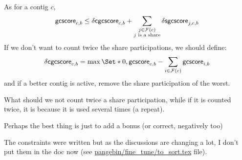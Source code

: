 \begin{ideabox}
    As for a contig \(c\), 
    \[
    \mathsf{gcscore}_{c, b} \leq \mathsf{\delta cgcscore}_{c, b} + \sum_{\substack{
        j \in \mathcal{F}{}(c) \\
        j \text{ is a share}
    }}\mathsf{\delta sgcscore}_{j, c, b}
    \]
    If we don't want to count twice the share participations, we should define:
    \[
    \dcgcscore{c}{b} = \max \Set*{
            0, 
            \gcscore{c}{b} - \sum_{i \in \Fragments{}(c)} \gcscore{i}{b}
        } 
    \]
    and if a better contig is active, remove the share participation of the worst.

    \begin{questionbox}
        What should we not count twice a share participation, while if it is counted twice, it is because it is used several times (a repeat).

        Perhaps the best thing is just to add a bonus (or correct, negatively too)
    \end{questionbox}
\end{ideabox}

\begin{notebox}
    The constraints were written but as the discussions are changing a lot, I don't put them in the doc now (see \url{pangebin/fine_tune/to_sort.tex} file).  
\end{notebox}